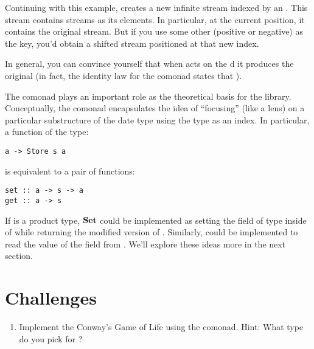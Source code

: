 Continuing with this example,  creates a new infinite
stream indexed by an . This stream contains streams as its
elements. In particular, at the current position, it contains the
original stream. But if you use some other  (positive or
negative) as the key, you'd obtain a shifted stream positioned at that
new index.

In general, you can convince yourself that when  acts on
the d  it produces the original
 (in fact, the identity law for the comonad states that
).

The  comonad plays an important role as the theoretical
basis for the  library. Conceptually, the
 comonad encapsulates the idea of ``focusing'' (like
a lens) on a particular substructure of the date type  using
the type  as an index. In particular, a function of the type:

\begin{Verbatim}[commandchars=\\\{\}]
a -> Store s a
\end{Verbatim}
is equivalent to a pair of functions:

\begin{Verbatim}[commandchars=\\\{\}]
set :: a -> s -> a
get :: a -> s
\end{Verbatim}
If  is a product type, $\mathbf{Set}$ could be implemented as
setting the field of type  inside of  while
returning the modified version of . Similarly, 
could be implemented to read the value of the  field from
. We'll explore these ideas more in the next section.

\section{Challenges}\label{challenges}

\begin{enumerate}
\tightlist
\item
  Implement the Conway's Game of Life using the  comonad.
  Hint: What type do you pick for ?
\end{enumerate}